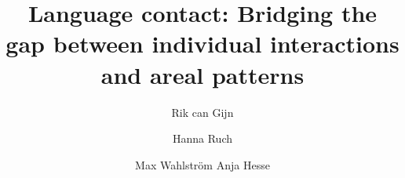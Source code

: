 \renewcommand{\lsSeries}{calseries}
\renewcommand{\lsSeriesNumber}{??}

\title{Language contact: Bridging the gap between individual interactions and areal patterns }
\author{Rik can Gijn \and Hanna Ruch \and Max Wahlström \lastand Anja Hesse}

